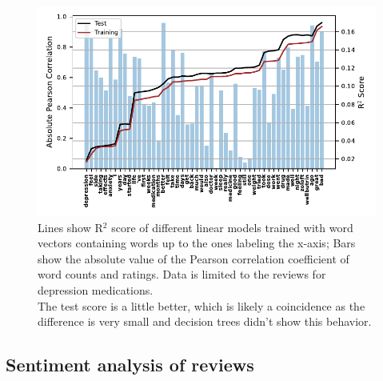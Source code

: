 \documentclass{article}
\begin{document}
\begin{figure}[htb]
    \centering
    \includegraphics[width = \textwidth]{plots/score_corr_normalized.pdf}
    \caption{Lines show R$^2$ score of different linear models trained with word vectors containing words up to the ones labeling the x-axis; Bars show the absolute value of the Pearson correlation coefficient of word counts and ratings. Data is limited to the reviews for depression medications.\\
    The test score is a little better, which is likely a coincidence as the difference is very small and decision trees didn't show this behavior.}
    \label{fig:score_corr}
\end{figure}

\subsection{Sentiment analysis of reviews}
\end{document}
